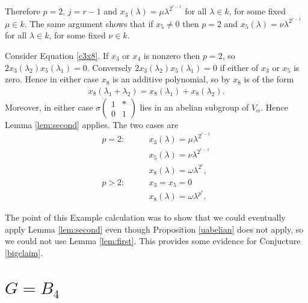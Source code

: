 Therefore $p = 2$, $j=r-1$ and $x_3(\lambda) = \mu \lambda^{2^{r-1}}$ for all $\lambda\in k$, for some fixed $\mu\in k$. The same argument shows that if $x_5 \neq 0$ then $p=2$ and $x_5(\lambda) = \nu \lambda^{2^{r-1}}$ for all $\lambda \in k$, for some fixed $\nu\in k$.

Consider Equation \ref{c3x8}. If $x_3$ or $x_4$ is nonzero then $p=2$, so $2x_3(\lambda_2)x_5(\lambda_1) = 0$. Conversely $2x_3(\lambda_2)x_5(\lambda_1) = 0$ if either of $x_3$ or $x_5$ is zero. Hence in either case $x_8$ is an additive polynomial, so by \cite[\S 20.3, Lemma A]{humphreys1975linear} $x_8$ is of the form
\begin{align*}
	x_8(\lambda_1 + \lambda_2) = x_8(\lambda_1) + x_8(\lambda_2).
\end{align*}
Moreover, in either case $\sigma\left(\begin{matrix}1 & *\\0 & 1\end{matrix}\right)$ lies in an abelian subgroup of $V_\alpha$. Hence Lemma \ref{lem:second} applies. The two cases are
\begin{align*}
p=2: \qquad&x_3(\lambda) = \mu \lambda^{2^{r-1}} \\
	&x_5(\lambda) = \nu \lambda^{2^{r-1}} \\
	&x_8(\lambda) = \omega \lambda^{2^r}, \\
p>2: \qquad&x_3=x_5=0 \\
	&x_8(\lambda) = \omega \lambda^{p^r}.
\end{align*}

The point of this Example calculation was to show that we could eventually apply Lemma \ref{lem:second} even though Proposition \ref{uabelian} does not apply, so we could not use Lemma \ref{lem:first}. This provides some evidence for Conjucture \ref{bigclaim}.



\section{$G = B_4$}

